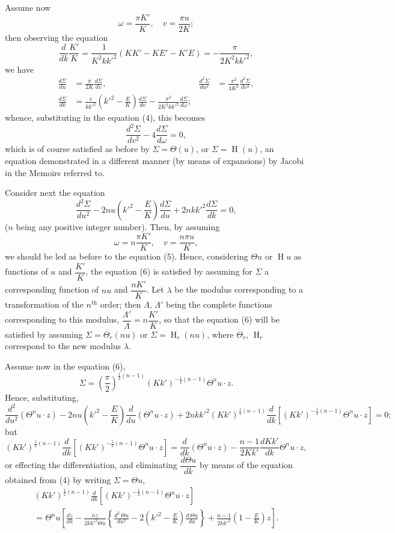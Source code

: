 \documentclass[12pt,a4paper]{article}
\theoremstyle{plain}
\DeclareMathOperator{\Hf}{H}
\begin{document}
Assume now
\[
\omega = \frac{\pi K'}{K}, \quad v = \frac{\pi u}{2K};
\]
then observing the equation
\[
\frac{d}{dk}\frac{K'}{K} = \frac{1}{K^2 k k'^2}(KK' - KE' - K'E) = -\frac{\pi}{2K^2 k k'^2},
\]
we have
\begin{align*}
\frac{d\Sigma}{du} &= \frac{\pi}{2K} \frac{d\Sigma}{dv}, & \frac{d^2\Sigma}{du^2} &= \frac{\pi^2}{4K^2} \frac{d^2\Sigma}{dv^2}, \\
\frac{d\Sigma}{dk} &= \frac{v}{kk'^2}\left(k'^2 - \frac{E}{K}\right) \frac{d\Sigma}{dv} - \frac{\pi^2}{2K^2 k k'^2} \frac{d\Sigma}{d\omega};
\end{align*}
whence, substituting in the equation (4), this becomes
\[
\frac{d^2\Sigma}{dv^2} - 4\frac{d\Sigma}{d\omega} = 0 \tag{5},
\]
which is of course satisfied as before by $\Sigma = \Theta(u)$, or $\Sigma = \Hf(u)$, an equation demonstrated in a different manner (by means of expansions) by Jacobi in the Memoirs referred to.

Consider next the equation
\[
\frac{d^2\Sigma}{du^2} - 2nu\left(k'^2 - \frac{E}{K}\right)\frac{d\Sigma}{du} + 2nkk'^2\frac{d\Sigma}{dk} = 0 \tag{6},
\]
($n$ being any positive integer number). Then, by assuming
\[
\omega = n\frac{\pi K'}{K}, \quad v = \frac{n\pi u}{K},
\]
we should be led as before to the equation (5). Hence, considering $\Theta u$ or $\Hf u$ as functions of $u$ and $\dfrac{K'}{K}$, the equation (6) is satisfied by assuming for $\Sigma$ a corresponding function of $nu$ and $\dfrac{nK'}{K}$. Let $\lambda$ be the modulus corresponding to a transformation of the $n^{\text{th}}$ order; then $\Lambda$, $\Lambda'$ being the complete functions corresponding to this modulus, $\dfrac{\Lambda'}{\Lambda} = n\dfrac{K'}{K}$, so that the equation (6) will be satisfied by assuming $\Sigma = \Theta_r(nu)$ or $\Sigma = \Hf_r(nu)$, where $\Theta_r$, $\Hf_r$ correspond to the new modulus $\lambda$.


Assume now in the equation (6),
\[
\Sigma = \left(\frac{\pi}{2}\right)^{\frac{1}{2}(n-1)} (Kk')^{-\frac{1}{2}(n-1)} \Theta^n u \cdot z.
\]
Hence, substituting,
\[
\frac{d^2}{du^2}(\Theta^n u \cdot z) - 2nu\left(k'^2 - \frac{E}{K}\right) \frac{d}{du}(\Theta^n u \cdot z) + 2nkk'^2 (Kk')^{\frac{1}{2}(n-1)} \frac{d}{dk}[(Kk')^{-\frac{1}{2}(n-1)} \Theta^n u \cdot z] = 0;
\]
but
\[
(Kk')^{\frac{1}{2}(n-1)} \frac{d}{dk}[(Kk')^{-\frac{1}{2}(n-1)} \Theta^n u \cdot z] = \frac{d}{dk}(\Theta^n u \cdot z) - \frac{n-1}{2Kk'} \frac{dKk'}{dk} \Theta^n u \cdot z,
\]
or effecting the differentiation, and eliminating $\dfrac{d\Theta u}{dk}$ by means of the equation obtained from (4) by writing $\Sigma = \Theta u$,
\begin{multline*}
(Kk')^{\frac{1}{2}(n-1)} \frac{d}{dk}[(Kk')^{-\frac{1}{2}(n-1)} \Theta^n u \cdot z] \\
= \Theta^n u \left[\frac{dz}{dk} - \frac{nz}{2kk'^2 \Theta u} \left\{\frac{d^2\,\Theta u}{du^2} - 2\left(k'^2 - \frac{E}{K}\right) \frac{d\,\Theta u}{du}\right\} + \frac{n-1}{2kk'^2}\left(1 - \frac{E}{K}\right)z\right].
\end{multline*}
\end{document}
